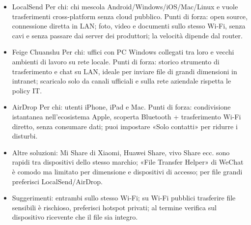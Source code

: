 
\begin{itemize}
  \item LocalSend Per chi: chi mescola Android/Windows/iOS/Mac/Linux e vuole trasferimenti cross-platform senza cloud pubblico. Punti di forza: open source, connessione diretta in LAN; foto, video e documenti sullo stesso Wi-Fi, senza cavi e senza passare dai server dei produttori; la velocità dipende dal router.
  \item Feige Chuanshu Per chi: uffici con PC Windows collegati tra loro e vecchi ambienti di lavoro su rete locale. Punti di forza: storico strumento di trasferimento e chat su LAN, ideale per inviare file di grandi dimensioni in intranet; scaricalo solo da canali ufficiali e sulla rete aziendale rispetta le policy IT.
  \item AirDrop Per chi: utenti iPhone, iPad e Mac. Punti di forza: condivisione istantanea nell'ecosistema Apple, scoperta Bluetooth + trasferimento Wi-Fi diretto, senza consumare dati; puoi impostare «Solo contatti» per ridurre i disturbi.
  \item Altre soluzioni: Mi Share di Xiaomi, Huawei Share, vivo Share ecc. sono rapidi tra dispositivi dello stesso marchio; «File Transfer Helper» di WeChat è comodo ma limitato per dimensione e dispositivi di accesso; per file grandi preferisci LocalSend/AirDrop.
  \item Suggerimenti: entrambi sullo stesso Wi-Fi; su Wi-Fi pubblici trasferire file sensibili è rischioso, preferisci hotspot privati; al termine verifica sul dispositivo ricevente che il file sia integro.
\end{itemize}


